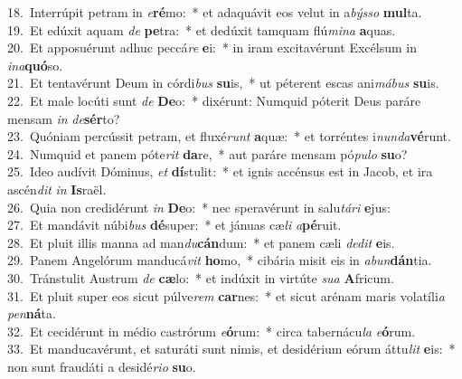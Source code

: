 {18.~}Interrúpit petram in \textit{e}\textbf{ré}mo:~* et adaquávit eos velut in a\textit{býs}\textit{so} \textbf{mul}ta.\\
{19.~}Et edúxit aquam \textit{de} \textbf{pe}tra:~* et dedúxit tamquam flú\textit{mi}\textit{na} \textbf{a}quas.\\
{20.~}Et apposuérunt adhuc peccá\textit{re} \textbf{e}i:~* in iram excitavérunt Excélsum in \textit{i}\textit{na}\textbf{quó}so.\\
{21.~}Et tentavérunt Deum in córdi\textit{bus} \textbf{su}is,~* ut péterent escas ani\textit{má}\textit{bus} \textbf{su}is.\\
{22.~}Et male locúti sunt \textit{de} \textbf{De}o:~* dixérunt: Numquid póterit Deus paráre mensam \textit{in} \textit{de}\textbf{sér}to?\\
{23.~}Quóniam percússit petram, et fluxé\textit{runt} \textbf{a}quæ:~* et torréntes i\textit{nun}\textit{da}\textbf{vé}runt.\\
{24.~}Numquid et panem póte\textit{rit} \textbf{da}re,~* aut paráre mensam pó\textit{pu}\textit{lo} \textbf{su}o?\\
{25.~}Ideo audívit Dóminus, \textit{et} \textbf{dí}stulit:~* et ignis accénsus est in Jacob, et ira ascén\textit{dit} \textit{in} \textbf{Is}raël.\\
{26.~}Quia non credidérunt \textit{in} \textbf{De}o:~* nec speravérunt in salu\textit{tá}\textit{ri} \textbf{e}jus:\\
{27.~}Et mandávit núbi\textit{bus} \textbf{dé}super:~* et jánuas cæ\textit{li} \textit{a}\textbf{pé}ruit.\\
{28.~}Et pluit illis manna ad man\textit{du}\textbf{cán}dum:~* et panem cæli \textit{de}\textit{dit} \textbf{e}is.\\
{29.~}Panem Angelórum manducá\textit{vit} \textbf{ho}mo,~* cibária misit eis in \textit{a}\textit{bun}\textbf{dán}tia.\\
{30.~}Tránstulit Austrum \textit{de} \textbf{cæ}lo:~* et indúxit in virtúte \textit{su}\textit{a} \textbf{A}fricum.\\
{31.~}Et pluit super eos sicut púlve\textit{rem} \textbf{car}nes:~* et sicut arénam maris volatíli\textit{a} \textit{pen}\textbf{ná}ta.\\
{32.~}Et cecidérunt in médio castrórum \textit{e}\textbf{ó}rum:~* circa tabernácu\textit{la} \textit{e}\textbf{ó}rum.\\
{33.~}Et manducavérunt, et saturáti sunt nimis, et desidérium eórum áttu\textit{lit} \textbf{e}is:~* non sunt fraudáti a desidé\textit{ri}\textit{o} \textbf{su}o.\\
